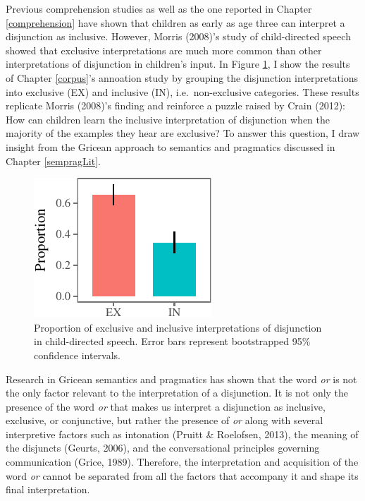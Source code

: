 \documentclass[oneside]{report}
\theoremstyle{definition}
\theoremstyle{definition}
\theoremstyle{definition}
\theoremstyle{remark}
\begin{document}
Previous comprehension studies as well as the one reported in Chapter
\ref{comprehension} have shown that children as early as age three can
interpret a disjunction as inclusive. However, Morris (2008)'s study of
child-directed speech showed that exclusive interpretations are much
more common than other interpretations of disjunction in children's
input. In Figure \ref{fig:interpretation}, I show the results of Chapter
\ref{corpus}'s annoation study by grouping the disjunction
interpretations into exclusive (EX) and inclusive (IN),
i.e.~non-exclusive categories. These results replicate Morris (2008)'s
finding and reinforce a puzzle raised by Crain (2012): How can children
learn the inclusive interpretation of disjunction when the majority of
the examples they hear are exclusive? To answer this question, I draw
insight from the Gricean approach to semantics and pragmatics discussed
in Chapter \ref{sempragLit}.
\begin{figure}[tb]

{\centering \includegraphics{figs/interpretation-1} 

}

\caption{Proportion of exclusive and inclusive interpretations of disjunction in child-directed speech. Error bars represent bootstrapped 95\% confidence intervals.}\label{fig:interpretation}
\end{figure}
Research in Gricean semantics and pragmatics has shown that the word
\emph{or} is not the only factor relevant to the interpretation of a
disjunction. It is not only the presence of the word \emph{or} that
makes us interpret a disjunction as inclusive, exclusive, or
conjunctive, but rather the presence of \emph{or} along with several
interpretive factors such as intonation (Pruitt \& Roelofsen, 2013), the
meaning of the disjuncts (Geurts, 2006), and the conversational
principles governing communication (Grice, 1989). Therefore, the
interpretation and acquisition of the word \emph{or} cannot be separated
from all the factors that accompany it and shape its final
interpretation.
\end{document}
